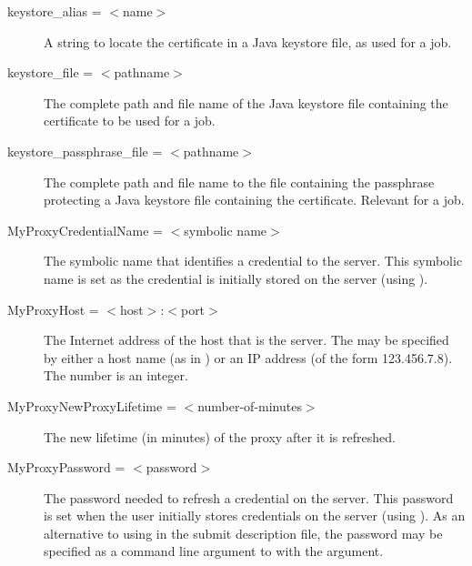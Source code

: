 \begin{description}
\item[keystore\_alias = $<$name$>$]
A string to locate the certificate in a Java keystore file,
as used for a  job.


\item[keystore\_file = $<$pathname$>$]
The complete path and file name of the Java keystore file
containing the certificate to be used for a  job.

\item[keystore\_passphrase\_file = $<$pathname$>$]
The complete path and file name
to the file containing the passphrase protecting a Java keystore
file containing the certificate.
Relevant for a  job.


\item[MyProxyCredentialName = $<$symbolic name$>$]
The symbolic name that identifies a credential to the  server.
This symbolic name is set as the credential is
initially stored on the server (using ).



\item[MyProxyHost = $<$host$>$:$<$port$>$]
The Internet address of the host that is the  server.
The  may be specified by either a host name
(as in ) or an IP address
(of the form 123.456.7.8).
The  number is an integer.


\item[MyProxyNewProxyLifetime = $<$number-of-minutes$>$]
The new lifetime (in minutes) of the proxy after it is refreshed.


\item[MyProxyPassword = $<$password$>$]
The password needed to refresh a credential on the  server.
This password is set when the user initially stores
credentials on the server (using ).
As an alternative to using  in the
submit description file,
the password may be specified as a command line argument to 
with the  argument.


\end{description}
